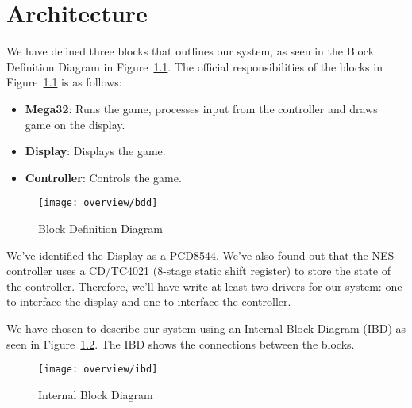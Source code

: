 \chapter{Architecture}

We have defined three blocks that outlines our system, as seen in the Block Definition Diagram in Figure~\ref{fig:bdd}. The official responsibilities of the blocks in Figure~\ref{fig:bdd} is as follows:

\begin{itemize}
	\item \textbf{Mega32}: Runs the game, processes input from the controller and draws game on the display.
	\item \textbf{Display}: Displays the game.
	\item \textbf{Controller}: Controls the game.
\end{itemize}

\begin{figure}
\centering
\texttt{[image: overview/bdd]}
\caption{Block Definition Diagram}
\label{fig:bdd}
\end{figure}

We've identified the Display as a PCD8544. We've also found out that the NES controller uses a CD/TC4021 (8-stage static shift register) to store the state of the controller. Therefore, we'll have write at least two drivers for our system: one to interface the display and one to interface the controller.

We have chosen to describe our system using an Internal Block Diagram (IBD) as seen in Figure~\ref{fig:ibd}. The IBD shows the connections between the blocks.

\begin{figure}
\centering
\texttt{[image: overview/ibd]}
\caption{Internal Block Diagram}
\label{fig:ibd}
\end{figure}


